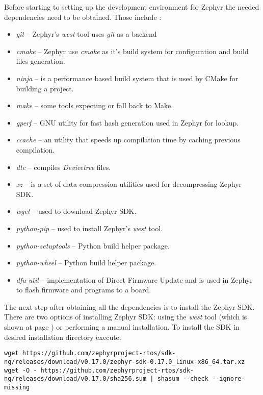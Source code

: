 \documentclass[twoside, 12pt]{article}
\begin{document}
Before starting to setting up the development environment for Zephyr the needed dependencies 
need to be obtained. Those include :
\begin{itemize}
    \item \textit{git} -- Zephyr's \textit{west} tool uses \textit{git} as a backend
    \item \textit{cmake} -- Zephyr use \textit{cmake} as it's build system for configuration 
    and build files generation.
    \item \textit{ninja} -- is a performance based build system that is used by CMake for building a project.
    \item \textit{make} -- some tools expecting or fall back to Make.
    \item \textit{gperf} -- GNU utility for fast hash generation used in Zephyr for lookup. 
    \item \textit{ccache} -- an utility that speeds up compilation time by caching previous compilation.  
    \item \textit{dtc} -- compiles \textit{Devicetree} files.
    \item \textit{xz} -- is a set of data compression utilities used for decompressing Zephyr SDK.
    \item \textit{wget} -- used to download Zephyr SDK.
    \item \textit{python-pip} -- used to install Zephyr's \textit{west} tool.
    \item \textit{python-setuptools} -- Python build helper package.
    \item \textit{python-wheel} -- Python build helper package.
    \item \textit{dfu-util} -- implementation of Direct Firmware Update and is used in Zephyr to flash firmware and programs to a board. 
\end{itemize}

The next step after obtaining all the dependencies is to install the Zephyr SDK. There are
two options of installing Zephyr SDK: using the \textit{west} tool (which is shown at page \pageref{west_sdk_install}) or 
performing a manual installation. To install the SDK in desired installation directory 
execute:
\begin{lstlisting}[caption=Installing Zephyr SDK: obtaining SDK, breaklines=true]
wget https://github.com/zephyrproject-rtos/sdk-ng/releases/download/v0.17.0/zephyr-sdk-0.17.0_linux-x86_64.tar.xz
wget -O - https://github.com/zephyrproject-rtos/sdk-ng/releases/download/v0.17.0/sha256.sum | shasum --check --ignore-missing
\end{lstlisting}
\end{document}
